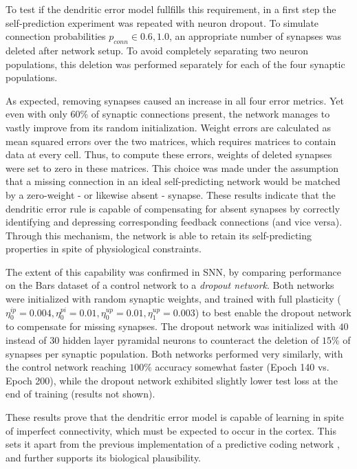 To test if the dendritic error model fullfills this requirement, in a first step the self-prediction experiment was
repeated with neuron dropout. To simulate connection probabilities $p_{conn} \in {0.6, 1.0}$, an appropriate number of
synapses was deleted after network setup. To avoid completely separating two neuron populations, this deletion was
performed separately for each of the four synaptic populations.

As expected, removing synapses caused an increase in all four error metrics. Yet even with only 60\% of synaptic
connections present, the network manages to vastly improve from its random initialization. Weight errors are calculated
as mean squared errors over the two matrices, which requires matrices to contain data at every cell. Thus, to compute
these errors, weights of deleted synapses were set to zero in these matrices. This choice was made under the assumption
that a missing connection in an ideal self-predicting network would be matched by a zero-weight - or likewise absent -
synapse. These results indicate that the dendritic error rule is capable of compensating for absent synapses by
correctly identifying and depressing corresponding feedback connections (and vice versa). Through this mechanism, the
network is able to retain its self-predicting properties in spite of physiological constraints.


The extent of this capability was confirmed in SNN, by comparing performance on the Bars dataset of a control network to
a \textit{dropout network}. Both networks were initialized with random synaptic weights, and trained with full
plasticity ($\eta^{ip}_0 = 0.004, \eta^{pi}_0 = 0.01, \eta^{up}_0 = 0.01, \eta^{up}_1 = 0.003$) to best enable the
dropout network to compensate for missing synapses. The dropout network was initialized with $40$ instead of $30$ hidden
layer pyramidal neurons to counteract the deletion of $15\%$ of synapses per synaptic population. Both networks
performed very similarly, with the control network reaching $100\%$ accuracy somewhat faster (Epoch 140 vs. Epoch 200),
while the dropout network exhibited slightly lower test loss at the end of training (results not shown).

These results prove that the dendritic error model is capable of learning in spite of imperfect connectivity, which must
be expected to occur in the cortex. This sets it apart from the previous implementation of a predictive coding network
\citep{Whittington2017}, and further supports its biological plausibility.



